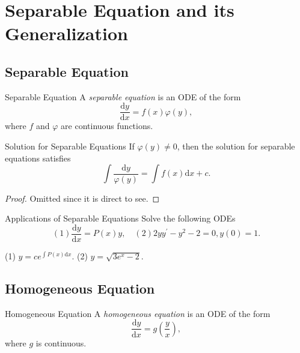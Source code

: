 
\section{Separable Equation and its Generalization}

\subsection{Separable Equation}

\begin{definition}{Separable Equation}{}
  A \emph{separable equation} is an ODE of the form
  \begin{equation}
    \frac{\mathrm{d} y}{\mathrm{d} x} = f(x)\varphi(y),
  \end{equation}
  where $f$ and $\varphi$ are continuous functions.
\end{definition}

\begin{proposition}{Solution for Separable Equations}{}
  If $\varphi(y) \neq 0$,
  then the solution for separable equations satisfies
  \begin{equation}
    \int \frac{\mathrm{d} y}{\varphi(y)} = \int f(x)\mathrm{d} x + c.
  \end{equation}
\end{proposition}

\begin{proof}
  Omitted since it is direct to see.
\end{proof}

\begin{example}{Applications of Separable Equations}{}
  Solve the following ODEs
  \begin{equation}
    (1) \frac{\mathrm{d}y}{\mathrm{d} x} = P(x)y, \quad
    (2) 2yy^{\prime} - y^2 - 2 = 0, y(0) = 1.
  \end{equation}
\end{example}

\begin{solution}
  (1) $y = c e^{\int P(x)\mathrm{d} x}$.
  (2) $y = \sqrt{3e^x - 2}$.
\end{solution}

\subsection{Homogeneous Equation}

\begin{definition}{Homogeneous Equation}{}
  A \emph{homogeneous equation} is an ODE of the form
  \begin{equation}
    \frac{\mathrm{d} y}{\mathrm{d}x} = g \left( \frac{y}{x} \right),
  \end{equation}
  where $g$ is continuous.
\end{definition}

